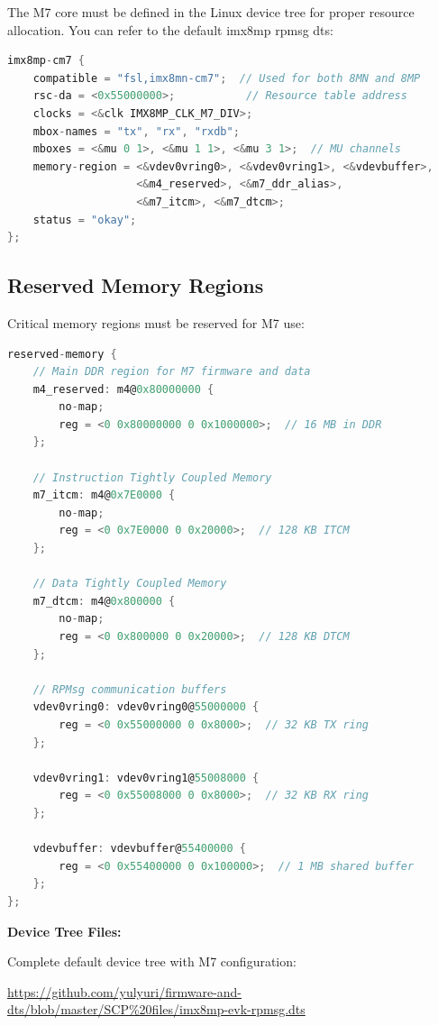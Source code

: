 \documentclass[12pt,a4paper]{report}
\begin{document}
The M7 core must be defined in the Linux device tree for proper resource allocation. You can refer to the default imx8mp rpmsg dts:

\begin{lstlisting}[language=c]
imx8mp-cm7 {
    compatible = "fsl,imx8mn-cm7";  // Used for both 8MN and 8MP
    rsc-da = <0x55000000>;           // Resource table address
    clocks = <&clk IMX8MP_CLK_M7_DIV>;
    mbox-names = "tx", "rx", "rxdb";
    mboxes = <&mu 0 1>, <&mu 1 1>, <&mu 3 1>;  // MU channels
    memory-region = <&vdev0vring0>, <&vdev0vring1>, <&vdevbuffer>,
                    <&m4_reserved>, <&m7_ddr_alias>, 
                    <&m7_itcm>, <&m7_dtcm>;
    status = "okay";
};
\end{lstlisting}

\subsection{Reserved Memory Regions}

Critical memory regions must be reserved for M7 use:

\begin{lstlisting}[language=c]
reserved-memory {
    // Main DDR region for M7 firmware and data
    m4_reserved: m4@0x80000000 {
        no-map;
        reg = <0 0x80000000 0 0x1000000>;  // 16 MB in DDR
    };

    // Instruction Tightly Coupled Memory
    m7_itcm: m4@0x7E0000 {
        no-map;
        reg = <0 0x7E0000 0 0x20000>;  // 128 KB ITCM
    };

    // Data Tightly Coupled Memory
    m7_dtcm: m4@0x800000 {
        no-map;
        reg = <0 0x800000 0 0x20000>;  // 128 KB DTCM
    };

    // RPMsg communication buffers
    vdev0vring0: vdev0vring0@55000000 {
        reg = <0 0x55000000 0 0x8000>;  // 32 KB TX ring
    };

    vdev0vring1: vdev0vring1@55008000 {
        reg = <0 0x55008000 0 0x8000>;  // 32 KB RX ring
    };

    vdevbuffer: vdevbuffer@55400000 {
        reg = <0 0x55400000 0 0x100000>;  // 1 MB shared buffer
    };
};
\end{lstlisting}

\begin{gitref}
\textbf{Device Tree Files:}

Complete default device tree with M7 configuration:

\url{https://github.com/yulyuri/firmware-and-dts/blob/master/SCP%20files/imx8mp-evk-rpmsg.dts}
\end{gitref}
\end{document}

